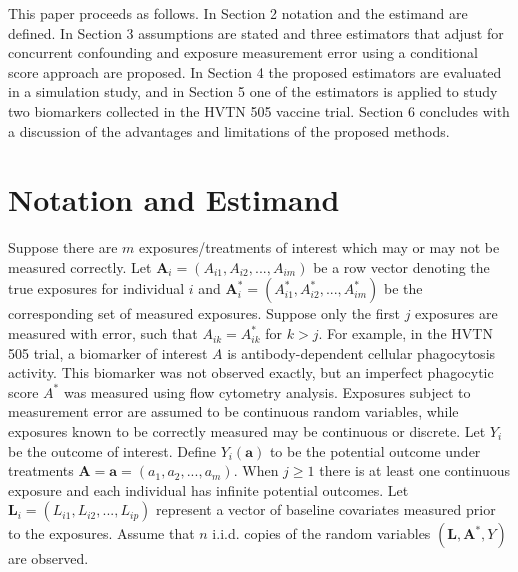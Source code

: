 \documentclass[useAMS,usenatbib,referee]{biom}
\begin{document}
This paper proceeds as follows. In Section 2 notation and the estimand are defined. In Section 3 assumptions are stated and three estimators that adjust for concurrent confounding and exposure measurement error using a conditional score approach are proposed. In Section 4 the proposed estimators are evaluated in a simulation study, and in Section 5 one of the estimators is applied to study two biomarkers collected in the HVTN 505 vaccine trial. Section 6 concludes with a discussion of the advantages and limitations of the proposed methods.

\section{Notation and Estimand}
\label{s:notation}

Suppose there are $m$ exposures/treatments of interest which may or may not be measured correctly. Let $\bm{A}_{i} = (A_{i1}, A_{i2}, ..., A_{im})$ be a row vector denoting the true exposures for individual $i$ and $\bm{A}^{*}_{i} =  (A^{*}_{i1}, A^{*}_{i2}, ..., A^{*}_{im})$ be the corresponding set of measured exposures. Suppose only the first $j$ exposures are measured with error, such that $A_{ik} = A^{*}_{ik}$ for $k > j$. For example, in the HVTN 505 trial, a biomarker of interest $A$ is antibody-dependent cellular phagocytosis activity. This biomarker was not observed exactly, but an imperfect phagocytic score $A^{*}$ was measured using flow cytometry analysis. Exposures subject to measurement error are assumed to be continuous random variables, while exposures known to be correctly measured may be continuous or discrete. Let $Y_{i}$ be the outcome of interest. Define $Y_{i}(\bm{a})$ to be the potential outcome under treatments $\bm{A} = \bm{a} = (a_{1}, a_{2}, ..., a_{m})$. When $j \geq 1$ there is at least one continuous exposure and each individual has infinite potential outcomes. Let $\bm{L}_{i} =  (L_{i1}, L_{i2}, ..., L_{ip})$ represent a vector of baseline covariates measured prior to the exposures. Assume that $n$ i.i.d. copies of the random variables $(\bm{L}, \bm{A}^{*}, Y)$ are observed.
\end{document}
